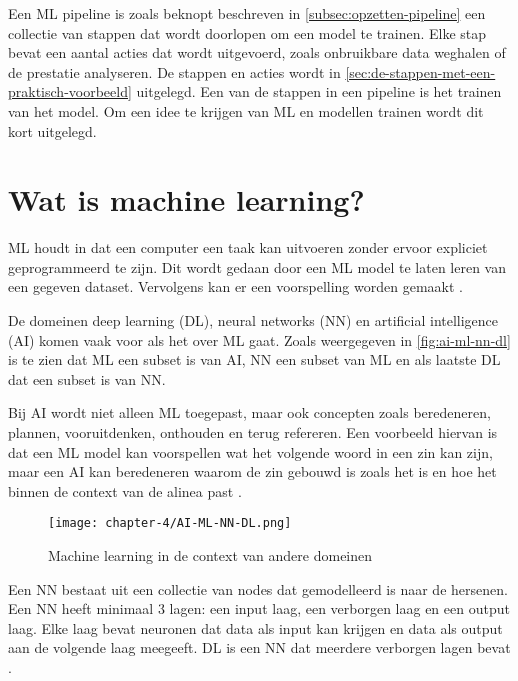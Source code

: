 
Een ML pipeline is zoals beknopt beschreven in \autoref{subsec:opzetten-pipeline} een collectie van stappen dat wordt doorlopen om een model te trainen. Elke stap bevat een aantal acties dat wordt uitgevoerd, zoals onbruikbare data weghalen of de prestatie analyseren. De stappen en acties wordt in \autoref{sec:de-stappen-met-een-praktisch-voorbeeld} uitgelegd. Een van de stappen in een pipeline is het trainen van het model. Om een idee te krijgen van ML en modellen trainen wordt dit kort uitgelegd.

\section{Wat is machine learning?}\label{sec:wat-is-machine-learning}
ML houdt in dat een computer een taak kan uitvoeren zonder ervoor expliciet geprogrammeerd te zijn. Dit wordt gedaan door een ML model te laten leren van een gegeven dataset. Vervolgens kan er een voorspelling worden gemaakt \cite[p.~1-3]{introduction-to-machine-learning}.

De domeinen deep learning (DL), neural networks (NN) en artificial intelligence (AI) komen vaak voor als het over ML gaat. Zoals weergegeven in \autoref{fig:ai-ml-nn-dl} is te zien dat ML een subset is van AI, NN een subset van ML en als laatste DL dat een subset is van NN.

Bij AI wordt niet alleen ML toegepast, maar ook concepten zoals beredeneren, plannen, vooruitdenken, onthouden en terug refereren. Een voorbeeld hiervan is dat een ML model kan voorspellen wat het volgende woord in een zin kan zijn, maar een AI kan beredeneren waarom de zin gebouwd is zoals het is en hoe het binnen de context van de alinea past \cite{ml-think-about-ml-brownlee}.

\begin{figure}[hbt!]
  \centering
  \texttt{[image: chapter-4/AI-ML-NN-DL.png]}
  \caption{Machine learning in de context van andere domeinen}
  \label{fig:ai-ml-nn-dl}
\end{figure}

Een NN bestaat uit een collectie van nodes dat gemodelleerd is naar de hersenen. Een NN heeft minimaal 3 lagen: een input laag, een verborgen laag en een output laag. Elke laag bevat neuronen dat data als input kan krijgen en data als output aan de volgende laag meegeeft. DL is een NN dat meerdere verborgen lagen bevat \cite{ml-neural-network-nicholson}.


